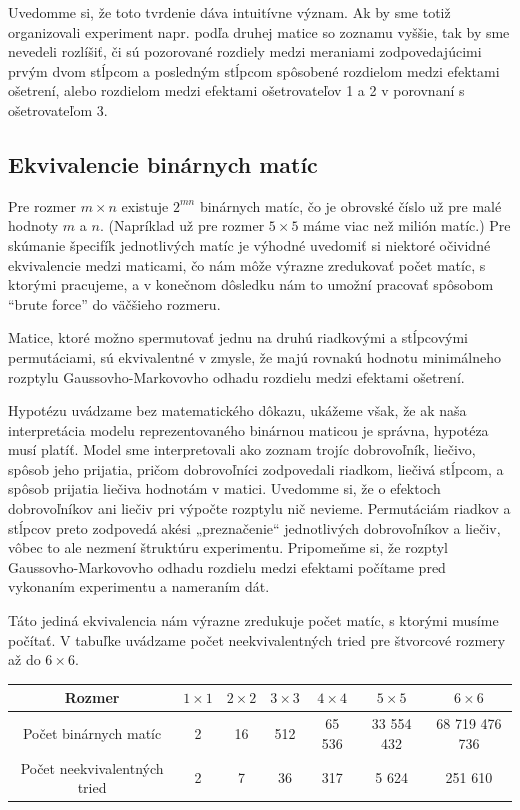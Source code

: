 Uvedomme si, že toto tvrdenie dáva intuitívne význam. Ak by sme totiž organizovali experiment napr. podľa druhej matice so zoznamu vyššie, 
tak by sme nevedeli rozlíšiť, či sú pozorované rozdiely medzi meraniami zodpovedajúcimi prvým dvom stĺpcom a posledným stĺpcom spôsobené rozdielom medzi efektami ošetrení, 
alebo rozdielom medzi efektami ošetrovateľov 1 a 2 v porovnaní s ošetrovateľom 3.

\subsection{Ekvivalencie binárnych matíc}

Pre rozmer $m \times n$ existuje $2^{mn}$ binárnych matíc, čo je obrovské číslo už pre malé hodnoty $m$ a $n$.
(Napríklad už pre rozmer $5 \times 5$ máme viac než milión matíc.)
Pre skúmanie špecifík jednotlivých matíc je výhodné uvedomiť si niektoré očividné ekvivalencie medzi maticami, 
čo nám môže výrazne zredukovať počet matíc, s ktorými pracujeme,
 a v konečnom dôsledku nám to umožní pracovať spôsobom “brute force” do väčšieho rozmeru.

\begin{hypoteza}

Matice, ktoré možno spermutovať jednu na druhú riadkovými a stĺpcovými permutáciami, sú ekvivalentné v zmysle, 
že majú rovnakú hodnotu minimálneho rozptylu Gaussovho-Markovovho odhadu rozdielu medzi efektami ošetrení.

\end{hypoteza}

Hypotézu uvádzame bez matematického dôkazu, ukážeme však, že ak naša interpretácia modelu reprezentovaného binárnou maticou je správna,
hypotéza musí platíť. Model sme interpretovali ako zoznam trojíc dobrovoľník, liečivo, spôsob jeho prijatia, 
pričom dobrovoľníci zodpovedali riadkom, liečivá stĺpcom, a spôsob prijatia liečiva hodnotám v matici. 
Uvedomme si, že o efektoch dobrovoľníkov ani liečiv pri výpočte rozptylu nič nevieme. 
Permutáciám riadkov a stĺpcov preto zodpovedá akési „preznačenie“ jednotlivých dobrovoľníkov a liečiv, 
vôbec to ale nezmení štruktúru experimentu. Pripomeňme si, že rozptyl Gaussovho-Markovovho odhadu rozdielu medzi efektami
počítame pred vykonaním experimentu a nameraním dát.

Táto jediná ekvivalencia nám výrazne zredukuje počet matíc, s ktorými musíme počítať. 
V tabuľke uvádzame počet neekvivalentných tried pre štvorcové rozmery až do $6 \times 6$.

\begin{center}
\begin{tabular}{ |c|c|c|c|c|c|c| }
  \hline
  Rozmer & $1 \times 1$ & $2 \times 2$ & $3 \times 3$ & $4 \times 4$ & $5 \times 5$ & $6 \times 6$ \\ \hline
  Počet binárnych matíc & 2 & 16 & 512 & 65 536 & 33 554 432 & 68 719 476 736 \\ \hline
  Počet neekvivalentných tried & 2 & 7 & 36 & 317 & 5 624 & 251 610 \\ \hline
\end{tabular}
\end{center}

